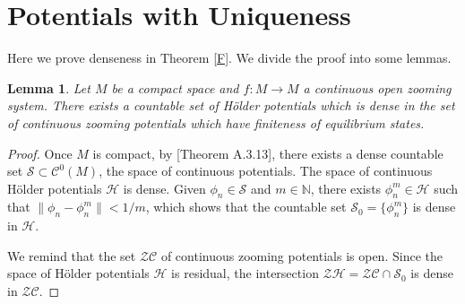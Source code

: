 \documentclass[12pt,a4paper]{amsart}
\theoremstyle{plain}
\newtheorem{lemma}{Lemma}[subsection]
\begin{document}
\section{Potentials with Uniqueness}\label{PrF}		

Here we prove denseness in Theorem \ref{F}. We divide the proof into some lemmas.

\begin{lemma}\label{dense}
	Let $M$ be a compact space and $f: M \to M$ a continuous open zooming system. There exists a countable set of H\"older potentials which is dense in the set of continuous zooming potentials which have finiteness of equilibrium states.
\end{lemma} 
\begin{proof}
	Once $M$ is compact, by \cite{OV}[Theorem A.3.13], there exists a dense countable set $\mathcal{S} \subset \mathcal{C}^{0}(M)$, the space of continuous potentials. The space of continuous H\"older potentials $\mathcal{H}$ is dense. Given $\phi_{n} \in \mathcal{S}$ and $m \in \mathbb{N}$, there exists $\phi_{n}^{m} \in \mathcal{H}$ such that $\parallel \phi_{n} - \phi_{n}^{m} \parallel < 1/m$, which shows that the countable set $\mathcal{S}_{0} = \{\phi_{n}^{m}\}$ is dense in $\mathcal{H}$.
	
	We remind that the set $\mathcal{ZC}$ of continuous zooming potentials is open. Since the space of H\"older potentials $\mathcal{H}$ is residual, the intersection $\mathcal{ZH} = \mathcal{ZC} \cap \mathcal{S}_{0}$ is dense in $\mathcal{ZC}$. 
	
	
	
\end{proof}
\end{document}

